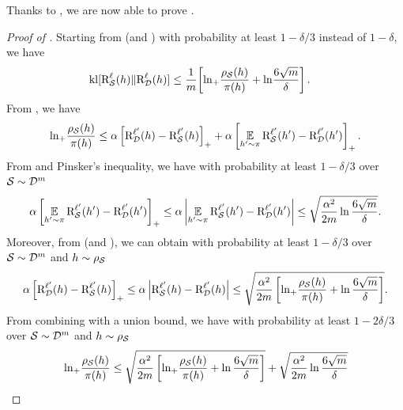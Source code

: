 \documentclass[twoside]{article}
\theoremstyle{plain}
\begin{document}
Thanks to , we are now able to prove .
\begin{proof}[Proof of ]
Starting from  (and ) with probability at least $1-\delta/3$ instead of $1-\delta$, we have
\begin{align}
\operatorname{kl}[\text{R}^{\ell}_{\mathcal{S}}(h) \|\text{R}^{\ell}_{\mathcal{D}}(h)] &\le \frac{1}{m}\!\left[ \ln_{+}\!\frac{\rho_{\mathcal{S}}(h)}{\pi(h)} + \ln\!\frac{6\sqrt{m}}{\delta}\right].\label{eq:proof-dis-kl-lever-risk-1}
\end{align}
From , we have
\begin{align}
\ln_{+}\!\frac{\rho_{\mathcal{S}}(h)}{\pi(h)} \le \alpha\left[\text{R}^{\ell'}_{\mathcal{D}}(h)-\text{R}^{\ell'}_{\mathcal{S}}(h)\right]_{+} + \alpha\left[\operatorname*{\mathbb{E}}_{h'\sim\pi} \text{R}^{\ell'}_{\mathcal{S}}(h')-\text{R}^{\ell'}_{\mathcal{D}}(h') \right]_{+}.\label{eq:proof-dis-kl-lever-risk-2}
\end{align}
From \citep[Equation (4)]{maurer2004note} and Pinsker's inequality, we have with probability at least $1-\delta/3$ over $\mathcal{S}\sim\mathcal{D}^m$
\begin{align}
\alpha\left[ \operatorname*{\mathbb{E}}_{h'\sim\pi}\text{R}^{\ell'}_{\mathcal{S}}(h')-\text{R}^{\ell'}_{\mathcal{D}}(h')\right]_{+} \le \alpha\left\vert\operatorname*{\mathbb{E}}_{h'\sim\pi}\text{R}^{\ell'}_{\mathcal{S}}(h')-\text{R}^{\ell'}_{\mathcal{D}}(h')\right\vert \le \sqrt{\frac{\alpha^2}{2m}\ln\frac{6\sqrt{m}}{\delta}}.\label{eq:proof-dis-kl-lever-risk-3}
\end{align}
Moreover, from  (and ), we can obtain with probability at least $1-\delta/3$ over $\mathcal{S}\sim\mathcal{D}^m$ and $h\sim\rho_{\mathcal{S}}$
\begin{align}
\alpha\left[\text{R}^{\ell'}_{\mathcal{D}}(h)-\text{R}^{\ell'}_{\mathcal{S}}(h)\right]_{+} 
\le \alpha\left\vert\text{R}^{\ell'}_{\mathcal{S}}(h)-\text{R}^{\ell'}_{\mathcal{D}}(h)\right\vert \le \sqrt{\frac{\alpha^2}{2m}\left[\ln_{+}\!\frac{\rho_{\mathcal{S}}(h)}{\pi(h)} + \ln\frac{6\sqrt{m}}{\delta} \right]}.\label{eq:proof-dis-kl-lever-risk-4}
\end{align}
From combining  with a union bound, we have with probability at least $1-2\delta/3$ over $\mathcal{S}\sim\mathcal{D}^m$ and $h\sim\rho_{\mathcal{S}}$
\begin{align*}
&\ln_{+}\!\frac{\AQ(h)}{\P(h)} \le \sqrt{\frac{\alpha^2}{2m}\LB\ln_{+}\!\frac{\AQ(h)}{\P(h)} + \ln\frac{6\sqrt{m}}{\delta}\RB} + \sqrt{\frac{\alpha^2}{2m}\ln\frac{6\sqrt{m}}{\delta}}\\

\end{align*}
\end{proof}
\end{document}
